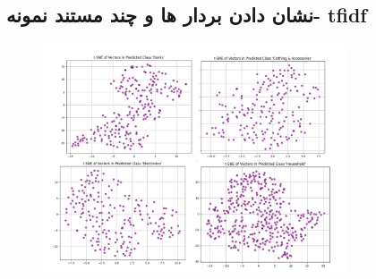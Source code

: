 \documentclass[a4paper,12pt]{article}
\begin{document}
\subsection*{نشان دادن بردار ها و چند مستند نمونه- tfidf}
\begin{figure}[H]
    \centering
    \includegraphics[width=0.8\textwidth]{vectorsTfidf.png}
    \label{fig:yourlabel}
\end{figure}
\end{document}
